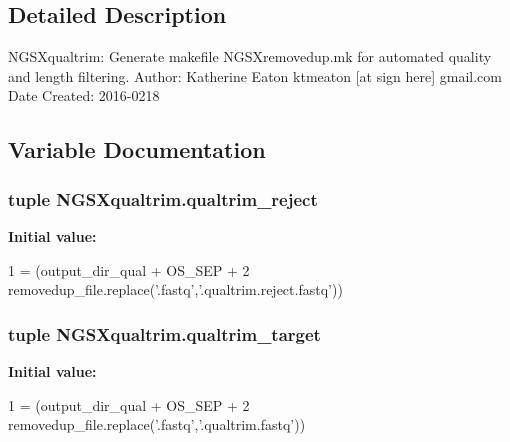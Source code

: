 \subsection{Detailed Description}
\begin{DoxyVerb}NGSXqualtrim:  Generate makefile NGSXremovedup.mk for automated quality and length filtering.
Author:         Katherine Eaton     ktmeaton [at sign here] gmail.com
Date Created:   2016-0218
\end{DoxyVerb}
 

\subsection{Variable Documentation}
\subsubsection[{\texorpdfstring{qualtrim\+\_\+reject}{qualtrim_reject}}]{\setlength{\rightskip}{0pt plus 5cm}tuple N\+G\+S\+Xqualtrim.\+qualtrim\+\_\+reject}\hypertarget{namespaceNGSXqualtrim_a2052348589df7e15269ee98517a239ef}{}\label{namespaceNGSXqualtrim_a2052348589df7e15269ee98517a239ef}
{\bfseries Initial value\+:}
\begin{DoxyCode}
1 = (output\_dir\_qual + OS\_SEP +
2                                 removedup\_file.replace(\textcolor{stringliteral}{'.fastq'},\textcolor{stringliteral}{'.qualtrim.reject.fastq'}))
\end{DoxyCode}
\subsubsection[{\texorpdfstring{qualtrim\+\_\+target}{qualtrim_target}}]{\setlength{\rightskip}{0pt plus 5cm}tuple N\+G\+S\+Xqualtrim.\+qualtrim\+\_\+target}\hypertarget{namespaceNGSXqualtrim_a4b39ac4581563ece0c3c29c4c9ae1dd2}{}\label{namespaceNGSXqualtrim_a4b39ac4581563ece0c3c29c4c9ae1dd2}
{\bfseries Initial value\+:}
\begin{DoxyCode}
1 = (output\_dir\_qual + OS\_SEP +
2                                 removedup\_file.replace(\textcolor{stringliteral}{'.fastq'},\textcolor{stringliteral}{'.qualtrim.fastq'}))
\end{DoxyCode}
